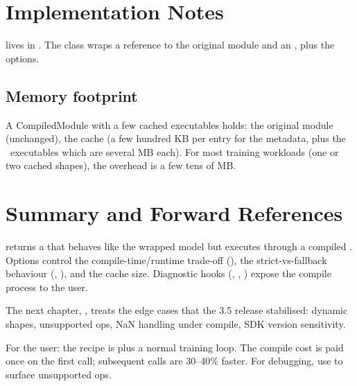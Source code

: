 \section{Implementation Notes}
\label{sec:compiled_module:impl}

 lives in
. The class wraps a
reference to the original module and an ,
plus the  options.

\subsection{Memory footprint}
\label{ssec:compiled_module:mem_footprint}

A CompiledModule with a few cached executables holds: the
original module (unchanged), the cache (a few hundred KB per
entry for the metadata, plus the \MPSGraph\ executables which
are several MB each). For most training workloads (one or two
cached shapes), the overhead is a few tens of MB.

\section{Summary and Forward References}
\label{sec:compiled_module:summary}

 returns a 
that behaves like the wrapped model but executes through a
compiled \MPSGraph. Options control the compile-time/runtime
trade-off (), the strict-vs-fallback behaviour
(, ), and the cache size. Diagnostic
hooks (, ,
) expose the compile process to the user.

The next chapter, , treats the
edge cases that the 3.5 release stabilised: dynamic shapes,
unsupported ops, NaN handling under compile, SDK version
sensitivity.

\begin{lucidnote}
For the user: the recipe is 
plus a normal training loop. The compile cost is paid once on
the first call; subsequent calls are 30--40\% faster. For
debugging, use  to surface unsupported ops.
\end{lucidnote}

